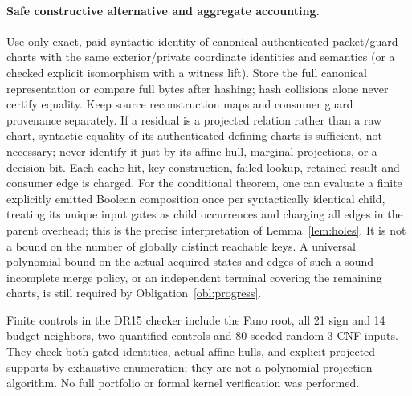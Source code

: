 \documentclass[11pt]{article}
\begin{document}
\paragraph{Safe constructive alternative and aggregate accounting.}
Use only exact, paid syntactic identity of canonical authenticated packet/guard charts with the same exterior/private coordinate identities and semantics (or a checked explicit isomorphism with a witness lift). Store the full canonical representation or compare full bytes after hashing; hash collisions alone never certify equality. Keep source reconstruction maps and consumer guard provenance separately. If a residual is a projected relation rather than a raw chart, syntactic equality of its authenticated defining charts is sufficient, not necessary; never identify it just by its affine hull, marginal projections, or a decision bit. Each cache hit, key construction, failed lookup, retained result and consumer edge is charged. For the conditional theorem, one can evaluate a finite explicitly emitted Boolean composition once per syntactically identical child, treating its unique input gates as child occurrences and charging all edges in the parent overhead; this is the precise interpretation of Lemma~\ref{lem:holes}. It is not a bound on the number of globally distinct reachable keys. A universal polynomial bound on the actual acquired states and edges of such a sound incomplete merge policy, or an independent terminal covering the remaining charts, is still required by Obligation~\ref{obl:progress}.

Finite controls in the DR15 checker include the Fano root, all 21 sign and 14 budget neighbors, two quantified controls and 80 seeded random 3-CNF inputs. They check both gated identities, actual affine hulls, and explicit projected supports by exhaustive enumeration; they are not a polynomial projection algorithm. No full portfolio or formal kernel verification was performed.
\end{document}
